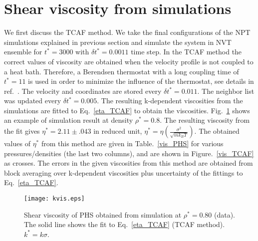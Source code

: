 \documentclass[preprint,pre,aps,superscriptaddress,a4paper]{revtex4}
\begin{document}
\section{Shear viscosity from simulations} 
We first discuss  the TCAF method.
We take the final configurations of the NPT simulations explained in previous section and  simulate the system in NVT ensemble for $t^*= 3000$ with $\delta t^*= 0.0011$ time step. In the TCAF method the correct values of viscosity are obtained when the velocity profile is not coupled to a heat bath. Therefore, a  Berendsen thermostat with a long coupling time of $t^*=11$ is used in order to minimize the influence of the thermostat, see details in ref.~\cite{hess:02:0}. The velocity and coordinates are stored every $\delta t^*= 0.011$.  The neighbor list was updated every $\delta t^*= 0.005$.
 The resulting k-dependent 
viscosities from the simulations  are fitted 
to  Eq.~\ref{eta_TCAF}  to obtain the viscosities. 
Fig.~\ref{tcaf_example} shows an example of  simulation  result  at density  $\rho^*=0.8$. The resulting viscosity from the fit gives  $\eta^*=2.11 \pm .043 $ in reduced unit, $\eta^*=\eta (\frac{\sigma ^2}{\sqrt {mk_B T} })$. 
The  obtained values of $\eta^*  $ from this method   are given in Table.~\ref{vis_PHS} for various pressures/densities (the last two columns), and are shown in   Figure.~\ref{vis_TCAF} as  crosses.  {   The errors in the given  viscosities from this method are obtained  from block averaging over k-dependent
viscosities  plus uncertainty  of  the fittings to Eq.~\ref{eta_TCAF}.  }
\begin{figure}
\centering
\vspace{1cm} 
\texttt{[image: kvis.eps]}
\vspace{-0.7cm}
\caption{{   Shear viscosity of PHS obtained from simulation at   $\rho^* =0.80$ (data). The solid line shows  the fit to Eq.~\ref{eta_TCAF} (TCAF method). $k^* =k\sigma$. }}
\label{tcaf_example}
\vspace{1cm}
\end{figure} 
\end{document}

